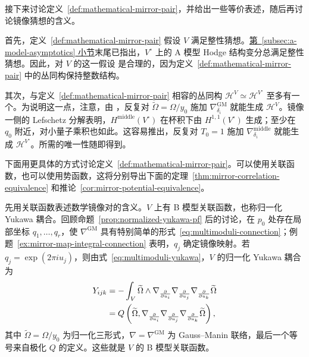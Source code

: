 接下来讨论定义~\ref{def:mathematical-mirror-pair}，并给出一些等价表述，随后再讨论镜像猜想的含义。

首先，定义~\ref{def:mathematical-mirror-pair} 假设 $V$ 满足整性猜想。\hyperref[subsec:a-model-asymptotics]{第~\ref*{subsec:a-model-asymptotics} 小节}末尾已指出，$V^\circ$ 上的 A 模型 Hodge 结构变分总满足整性猜想。因此，对 $V$ 的这一假设
是合理的，因为定义~\ref{def:mathematical-mirror-pair} 中的丛同构保持整数结构。

其次，与定义~\ref{def:mathematical-mirror-pair} 相容的丛同构 $\mathcal H^V\simeq\mathcal H^{V^\circ}$ 至多有一个。为说明这一点，注意，由 ，反复对 $\widetilde\Omega=\Omega/y_0$ 施加 $\nabla^{\mathrm{GM}}_{\delta_i}$ 就能生成 $\mathcal H^V$。镜像一侧的 Lefschetz 分解表明，$H^{\mathrm{middle}}(V^\circ)$ 在杯积下由 $H^{1,1}(V^\circ)$ 生成；至少在 $q_0$ 附近，对小量子乘积也如此。这容易推出，反复对 $T_0=1$ 施加 $\nabla^{\mathrm{middle}}_{\delta_i}$ 就能生成 $\mathcal H^{V^\circ}$。所需的唯一性随即得到。

下面用更具体的方式讨论定义~\ref{def:mathematical-mirror-pair}。可以使用关联函数，也可以使用势函数，这将分别导出下面的定理~\ref{thm:mirror-correlation-equivalence} 和推论~\ref{cor:mirror-potential-equivalence}。

先用关联函数表述数学镜像对的含义。$V$ 上有 B 模型关联函数，也称归一化 Yukawa 耦合。回顾命题~\ref{prop:normalized-yukawa-pf} 后的讨论，在 $p_0$ 处存在局部坐标 $q_1,\ldots,q_r$，使 $\nabla^{\mathrm{GM}}$ 具有特别简单的形式~\eqref{eq:multimoduli-connection}；例题~\ref{ex:mirror-map-integral-connection} 表明，$q_j$ 确定镜像映射。若 $q_j=\exp(2\pi iu_j)$，则由式~\eqref{eq:multimoduli-yukawa}，$V$ 的归一化 Yukawa 耦合为
\begin{equation}\label{eq:b-model-normalized-correlations}\index{Yukawa耦合@Yukawa 耦合!归一化|hyperpage}
\begin{aligned}
Y_{ijk}&=-\int_V\widetilde\Omega\wedge\nabla_{\frac{\partial}{\partial u_i}}\nabla_{\frac{\partial}{\partial u_j}}\nabla_{\frac{\partial}{\partial u_k}}\widetilde\Omega\\
&=Q\left(\widetilde\Omega,\nabla_{\frac{\partial}{\partial u_i}}\nabla_{\frac{\partial}{\partial u_j}}\nabla_{\frac{\partial}{\partial u_k}}\widetilde\Omega\right),
\end{aligned}
\end{equation}
其中 $\widetilde\Omega=\Omega/y_0$ 为归一化三形式，$\nabla=\nabla^{\mathrm{GM}}$ 为 Gauss--Manin 联络，最后一个等号来自极化 $Q$ 的定义。这些就是 $V$ 的 B 模型关联函数。

